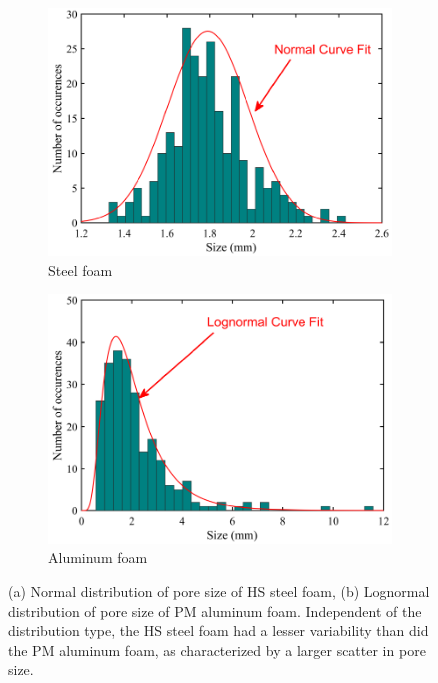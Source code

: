\documentclass[review]{elsarticle}
\begin{document}
\begin{figure}
	\centering
	\begin{subfigure}{.5\textwidth}
		\centering
		\includegraphics[width=0.95\linewidth]{Tex-Figures/Fig03a.pdf}
		\caption{Steel foam}
		\label{fig3:sub1}
	\end{subfigure}%
	\begin{subfigure}{.5\textwidth}
		\centering
		\includegraphics[width=0.95\linewidth]{Tex-Figures/Fig03b.pdf}
		\caption{Aluminum foam}
		\label{fig3:sub2}
	\end{subfigure}
	\caption{(a) Normal distribution of pore size of HS steel foam, (b) Lognormal distribution of pore size of PM aluminum foam. Independent of the distribution type, the HS steel foam had a lesser variability than did the PM aluminum foam, as characterized by a larger scatter in pore size.}
	\label{PoreSizeHistograms}
\end{figure}
\end{document}
